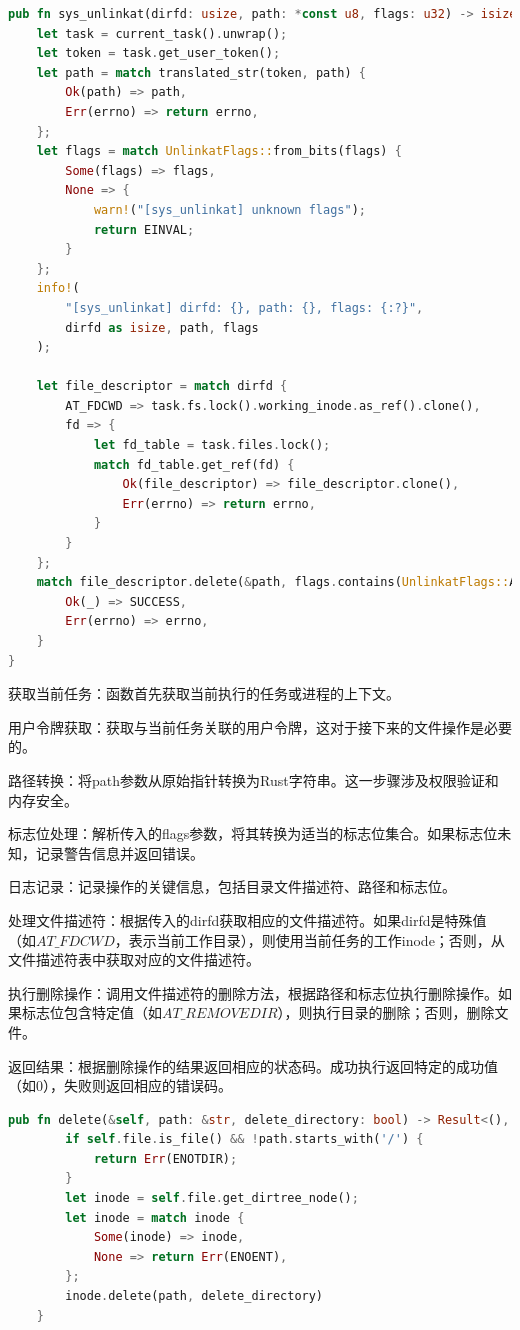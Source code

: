 \begin{lstlisting}[language=rust]
pub fn sys_unlinkat(dirfd: usize, path: *const u8, flags: u32) -> isize {
    let task = current_task().unwrap();
    let token = task.get_user_token();
    let path = match translated_str(token, path) {
        Ok(path) => path,
        Err(errno) => return errno,
    };
    let flags = match UnlinkatFlags::from_bits(flags) {
        Some(flags) => flags,
        None => {
            warn!("[sys_unlinkat] unknown flags");
            return EINVAL;
        }
    };
    info!(
        "[sys_unlinkat] dirfd: {}, path: {}, flags: {:?}",
        dirfd as isize, path, flags
    );

    let file_descriptor = match dirfd {
        AT_FDCWD => task.fs.lock().working_inode.as_ref().clone(),
        fd => {
            let fd_table = task.files.lock();
            match fd_table.get_ref(fd) {
                Ok(file_descriptor) => file_descriptor.clone(),
                Err(errno) => return errno,
            }
        }
    };
    match file_descriptor.delete(&path, flags.contains(UnlinkatFlags::AT_REMOVEDIR)) {
        Ok(_) => SUCCESS,
        Err(errno) => errno,
    }
}
\end{lstlisting}

获取当前任务：函数首先获取当前执行的任务或进程的上下文。

用户令牌获取：获取与当前任务关联的用户令牌，这对于接下来的文件操作是必要的。

路径转换：将path参数从原始指针转换为Rust字符串。这一步骤涉及权限验证和内存安全。

标志位处理：解析传入的flags参数，将其转换为适当的标志位集合。如果标志位未知，记录警告信息并返回错误。

日志记录：记录操作的关键信息，包括目录文件描述符、路径和标志位。

处理文件描述符：根据传入的dirfd获取相应的文件描述符。如果dirfd是特殊值（如$AT\_FDCWD$，表示当前工作目录），则使用当前任务的工作inode；否则，从文件描述符表中获取对应的文件描述符。

执行删除操作：调用文件描述符的删除方法，根据路径和标志位执行删除操作。如果标志位包含特定值（如$AT\_REMOVEDIR$），则执行目录的删除；否则，删除文件。

返回结果：根据删除操作的结果返回相应的状态码。成功执行返回特定的成功值（如0），失败则返回相应的错误码。

\begin{lstlisting}[language=rust]
    pub fn delete(&self, path: &str, delete_directory: bool) -> Result<(), isize> {
        if self.file.is_file() && !path.starts_with('/') {
            return Err(ENOTDIR);
        }
        let inode = self.file.get_dirtree_node();
        let inode = match inode {
            Some(inode) => inode,
            None => return Err(ENOENT),
        };
        inode.delete(path, delete_directory)
    }
\end{lstlisting}

